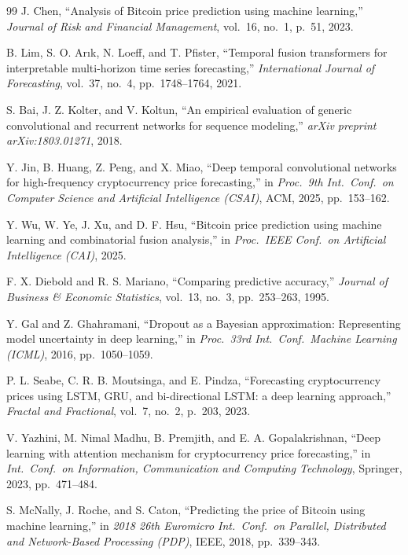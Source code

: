 \documentclass[12pt]{article}
\begin{document}
\begin{thebibliography}{99}
J. Chen, ``Analysis of Bitcoin price prediction using machine learning,'' \textit{Journal of Risk and Financial Management}, vol.\ 16, no.\ 1, p.\ 51, 2023.

B. Lim, S. O. Ar{\i}k, N. Loeff, and T. Pfister, ``Temporal fusion transformers for interpretable multi-horizon time series forecasting,'' \textit{International Journal of Forecasting}, vol.\ 37, no.\ 4, pp.\ 1748--1764, 2021.

S. Bai, J. Z. Kolter, and V. Koltun, ``An empirical evaluation of generic convolutional and recurrent networks for sequence modeling,'' \textit{arXiv preprint arXiv:1803.01271}, 2018.

Y. Jin, B. Huang, Z. Peng, and X. Miao, ``Deep temporal convolutional networks for high-frequency cryptocurrency price forecasting,'' in \textit{Proc.\ 9th Int.\ Conf.\ on Computer Science and Artificial Intelligence (CSAI)}, ACM, 2025, pp.\ 153--162.

Y. Wu, W. Ye, J. Xu, and D. F. Hsu, ``Bitcoin price prediction using machine learning and combinatorial fusion analysis,'' in \textit{Proc.\ IEEE Conf.\ on Artificial Intelligence (CAI)}, 2025.

F. X. Diebold and R. S. Mariano, ``Comparing predictive accuracy,'' \textit{Journal of Business \& Economic Statistics}, vol.\ 13, no.\ 3, pp.\ 253--263, 1995.

Y. Gal and Z. Ghahramani, ``Dropout as a Bayesian approximation: Representing model uncertainty in deep learning,'' in \textit{Proc.\ 33rd Int.\ Conf.\ Machine Learning (ICML)}, 2016, pp.\ 1050--1059.

P. L. Seabe, C. R. B. Moutsinga, and E. Pindza, ``Forecasting cryptocurrency prices using LSTM, GRU, and bi-directional LSTM: a deep learning approach,'' \textit{Fractal and Fractional}, vol.\ 7, no.\ 2, p.\ 203, 2023.

V. Yazhini, M. Nimal Madhu, B. Premjith, and E. A. Gopalakrishnan, ``Deep learning with attention mechanism for cryptocurrency price forecasting,'' in \textit{Int.\ Conf.\ on Information, Communication and Computing Technology}, Springer, 2023, pp.\ 471--484.

S. McNally, J. Roche, and S. Caton, ``Predicting the price of Bitcoin using machine learning,'' in \textit{2018 26th Euromicro Int.\ Conf.\ on Parallel, Distributed and Network-Based Processing (PDP)}, IEEE, 2018, pp.\ 339--343.


\end{thebibliography}
\end{document}
